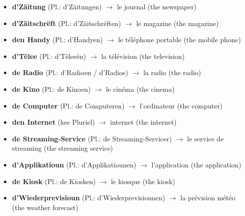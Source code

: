\begin{itemize}
    \item \textbf{d'Zäitung} (Pl.: d'Zäitungen) $\rightarrow$ le journal (the newspaper)
    \item \textbf{d'Zäitschrëft} (Pl.: d'Zäitschrëften) $\rightarrow$ le magazine (the magazine)
    \item \textbf{den Handy} (Pl.: d'Handyen) $\rightarrow$ le téléphone portable (the mobile phone)
    \item \textbf{d'Tëlee} (Pl.: d'Tëleeën) $\rightarrow$ la télévision (the television)
    \item \textbf{de Radio} (Pl.: d'Radioen / d'Radios) $\rightarrow$ la radio (the radio)
    \item \textbf{de Kino} (Pl.: de Kinoen) $\rightarrow$ le cinéma (the cinema)
    \item \textbf{de Computer} (Pl.: de Computeren) $\rightarrow$ l'ordinateur (the computer)
    \item \textbf{den Internet} (kee Pluriel) $\rightarrow$ internet (the internet)
    \item \textbf{de Streaming-Service} (Pl.: de Streaming-Servicer) $\rightarrow$ le service de streaming (the streaming service)
    \item \textbf{d'Applikatioun} (Pl.: d'Applikatiounen) $\rightarrow$ l'application (the application)
    \item \textbf{de Kiosk} (Pl.: de Kiosken) $\rightarrow$ le kiosque (the kiosk)
    \item \textbf{d'Wiederprevisioun} (Pl.: d'Wiederprevisiounen) $\rightarrow$ la prévision météo (the weather forecast)
\end{itemize}

\vspace{1em}

